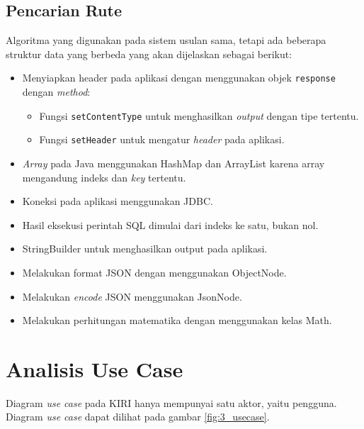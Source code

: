\subsection{Pencarian Rute}
Algoritma yang digunakan pada sistem usulan sama, tetapi ada beberapa struktur data yang berbeda yang akan dijelaskan sebagai berikut:
\begin{itemize}
	\item Menyiapkan header pada aplikasi dengan menggunakan objek \verb!response! dengan \textit{method}:
	\begin{itemize}
		\item Fungsi \verb!setContentType! untuk menghasilkan \textit{output} dengan tipe tertentu.
		\item Fungsi \verb!setHeader! untuk mengatur \textit{header} pada aplikasi.
	\end{itemize}
	\item \textit{Array} pada Java menggunakan HashMap dan ArrayList karena array mengandung indeks dan \textit{key} tertentu.
	\item Koneksi pada aplikasi menggunakan JDBC.
	\item Hasil eksekusi perintah SQL dimulai dari indeks ke satu, bukan nol.
	\item StringBuilder untuk menghasilkan output pada aplikasi.
	\item Melakukan format JSON dengan menggunakan ObjectNode.
	\item Melakukan \textit{encode} JSON menggunakan JsonNode.
	\item Melakukan perhitungan matematika dengan menggunakan kelas Math.
\end{itemize}

\section{Analisis Use Case}
\label{sec:usecase}
Diagram \textit{use case} pada KIRI hanya mempunyai satu aktor, yaitu pengguna. Diagram \textit{use case} dapat dilihat pada gambar \ref{fig:3_usecase}.


